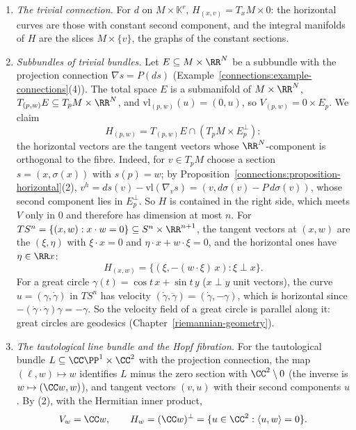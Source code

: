 \begin{example}\label{connections:example-horizontal}
\begin{enumerate}
\item \emph{The trivial connection.} For $d$ on $M \times \mathbb{K}^r$, $H_{(x, v)} = T_xM \times 0$: the horizontal curves are those with constant second component, and the integral
manifolds of $H$ are the slices $M \times \{v\}$, the graphs of the constant sections.
\item \emph{Subbundles of trivial bundles.} Let $E \subseteq M \times \RR^N$ be a subbundle with the projection connection $\nabla s = P(ds)$ (Example~\ref{connections:example-connections}(4)).
The total space $E$ is a submanifold of $M \times \RR^N$, $T_{(p, w)}E \subseteq T_pM \times \RR^N$, and $\mathrm{vl}_{(p, w)}(u) = (0, u)$, so $V_{(p, w)} = 0 \times E_p$. We claim
\[
H_{(p, w)} = T_{(p, w)}E \cap (T_pM \times E_p^\perp):
\]
the horizontal vectors are the tangent vectors whose $\RR^N$-component is orthogonal to the fibre. Indeed, for $v \in T_pM$ choose a section $s = (x, \sigma(x))$ with $s(p) = w$; by
Proposition~\ref{connections:proposition-horizontal}(2), $v^h = ds(v) - \mathrm{vl}(\nabla_vs) = (v, d\sigma(v) - P\,d\sigma(v))$, whose second component lies in $E_p^\perp$. So $H$ is
contained in the right side, which meets $V$ only in $0$ and therefore has dimension at most $n$. For $TS^n = \{(x, w) : x \cdot w = 0\} \subseteq S^n \times \RR^{n+1}$, the tangent vectors
at $(x, w)$ are the $(\xi, \eta)$ with $\xi \cdot x = 0$ and $\eta \cdot x + w \cdot \xi = 0$, and the horizontal ones have $\eta \in \RR x$:
\[
H_{(x, w)} = \{(\xi, -(w \cdot \xi)\,x) : \xi \perp x\}.
\]
For a great circle $\gamma(t) = \cos t\,x + \sin t\,y$ ($x \perp y$ unit vectors), the curve $u = (\gamma, \dot\gamma)$ in $TS^n$ has velocity $(\dot\gamma, \ddot\gamma) = (\dot\gamma, -\gamma)$,
which is horizontal since $-(\dot\gamma \cdot \dot\gamma)\gamma = -\gamma$. So the velocity field of a great circle is parallel along it: great circles are geodesics
(Chapter~\ref{riemannian-geometry}).
\item \emph{The tautological line bundle and the Hopf fibration.} For the tautological bundle $L \subseteq \CC\PP^1 \times \CC^2$ with the projection connection, the map $(\ell, w) \mapsto w$
identifies $L$ minus the zero section with $\CC^2 \setminus 0$ (the inverse is $w \mapsto (\CC w, w)$), and tangent vectors $(v, u)$ with their second components $u$. By (2), with the
Hermitian inner product,
\[
V_w = \CC w, \qquad H_w = (\CC w)^\perp = \{u \in \CC^2 : \langle u, w\rangle = 0\}.
\]
\end{enumerate}
\end{example}
